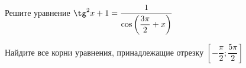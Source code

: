 \begin{ex}
	\begin{condition}
		\begin{enumcols}[label=\asbuk*)]
			\item Решите уравнение \( \tg^2 x + 1 = \dfrac{1}{\cos{\left(\dfrac{3\pi}{2}+x\right)}} \)
			\item Найдите все корни уравнения, принадлежащие отрезку \( \left[-\dfrac{\pi}{2};\dfrac{5\pi}{2}\right] \)
		\end{enumcols}
	\end{condition}
\end{ex}